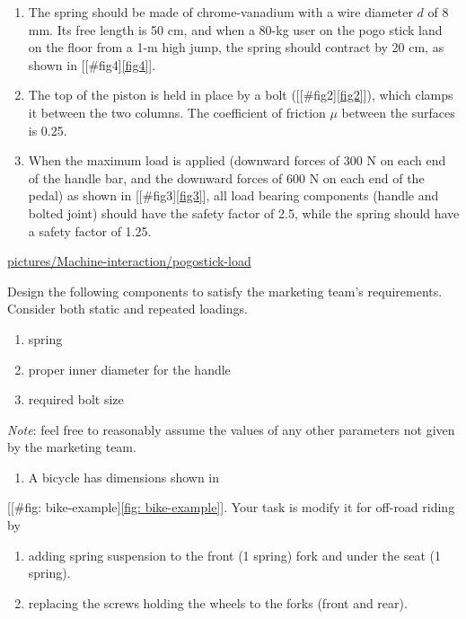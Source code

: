 \documentclass[a4paper,openany,12pt]{book}
\begin{document}
{{\begin{enumerate}
\item The spring should be made of chrome-vanadium with a wire diameter \(d\)
of 8 mm. Its free length is 50 cm, and when a 80-kg user on the pogo
stick land on the floor from a 1-m high jump, the spring should
contract by 20 cm, as shown in [[\#fig4]\ref{fig4}].

\item The top of the piston is held in place by a bolt ([[\#fig2]\ref{fig2}]),
which clamps it between the two columns. The coefficient of friction
\(\mu\) between the surfaces is 0.25.

\item When the maximum load is applied (downward forces of 300 N on each
end of the handle bar, and the downward forces of 600 N on each end
of the pedal) as shown in [[\#fig3]\ref{fig3}], all load bearing
components (handle and bolted joint) should have the safety factor of
2.5, while the spring should have a safety factor of 1.25.
\end{enumerate}


\url{pictures/Machine-interaction/pogostick-load}

Design the following components to satisfy the marketing team's
requirements. Consider both static and repeated loadings.

\begin{enumerate}
\item spring

\item proper inner diameter for the handle

\item required bolt size
\end{enumerate}

\emph{Note}: feel free to reasonably assume the values of any other
parameters not given by the marketing team.

\begin{enumerate}
\item A bicycle has dimensions shown in
\end{enumerate}
[[\#fig: bike-example]\ref{fig: bike-example}]. Your task is modify it for
off-road riding by

\begin{enumerate}
\item adding spring suspension to the front (1 spring) fork and under the
seat (1 spring).

\item replacing the screws holding the wheels to the forks (front and
rear).


\end{enumerate}}}
\end{document}
